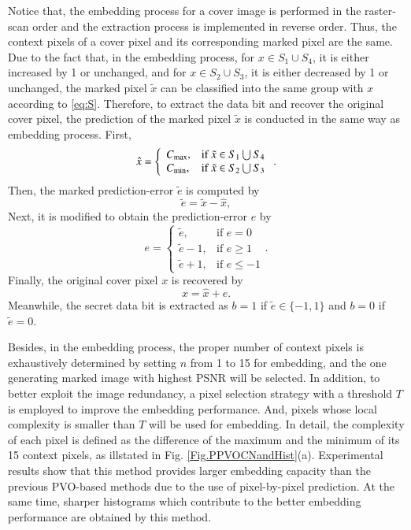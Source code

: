 \documentclass[review,3p,10pt,sort&compress]{elsarticle}
\begin{document}
Notice that, the embedding process for a cover image is performed in the raster-scan order and the extraction process is implemented in reverse order. Thus, the context pixels of a cover pixel and its corresponding marked pixel are the same. Due to the fact that, in the embedding process, for $x \in S_1 \cup S_4$, it is either increased by 1 or unchanged, and for $x \in S_2 \cup S_3$, it is either decreased by 1 or unchanged, the marked pixel $\tilde{x}$ can be classified into the same group with $x$ according to \eqref{eq:S}.
Therefore, to extract the data bit and recover the original cover pixel, the prediction of the marked pixel $\tilde{x}$ is conducted in the same way as embedding process. First,
\begin{equation}\label{eq:xhat2}
    \hat{x} = \left\{\begin{array}{ll}
    C_{\rm max},  & \text{if } \tilde{x} \in S_1 \bigcup S_4 \\
    C_{\rm min},  & \text{if } \tilde{x} \in S_2 \bigcup S_3
\end{array}\right.
.
\end{equation}
Then, the marked prediction-error $\tilde{e}$ is computed by
\begin{equation}\label{eq:dPE}
\tilde{e} = \tilde{x} - \hat{x},
\end{equation}
Next, it is modified to obtain the prediction-error $e$ by
\begin{equation}\label{eq:dPPVOMPE}
e = \left\{\begin{array}{ll}
\tilde{e},      & \text{if } e = 0      \\
\tilde{e} - 1,  & \text{if } e \geq 1   \\
\tilde{e} + 1,  & \text{if } e \leq -1
\end{array}\right..
\end{equation}
Finally, the original cover pixel $x$ is recovered by
\begin{equation}\label{eq:dPPVOX}
x = \hat{x} + e.
\end{equation}
Meanwhile, the secret data bit is extracted as $b = 1$ if $\tilde{e} \in \{-1, 1\}$ and $b = 0$ if $\tilde{e} = 0$.

Besides, in the embedding process, the proper number of context pixels is exhaustively determined by setting $n$ from 1 to 15 for embedding, and the one generating marked image with highest PSNR will be selected. In addition, to better exploit the image redundancy, a pixel selection strategy with a threshold $T$ is employed to improve the embedding performance. And, pixels whose local complexity is smaller than $T$ will be used for embedding. In detail, the complexity of each pixel is defined as the difference of the maximum and the minimum of its 15 context pixels, as illstated in Fig. \ref{Fig.PPVOCNandHist}(a). Experimental results show that this method provides larger embedding capacity than the previous PVO-based methods \cite{Li2013PVO,Peng2014IPVO} due to the use of pixel-by-pixel prediction. At the same time, sharper histograms which contribute to the better embedding performance are obtained by this method.
\end{document}
